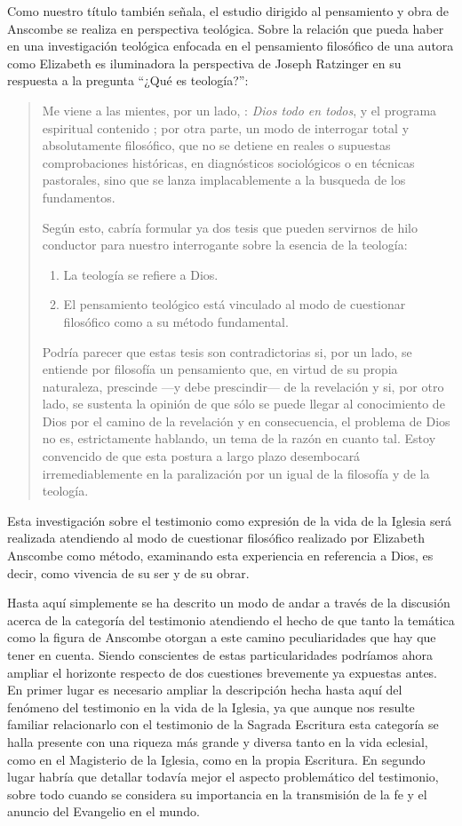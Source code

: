 Como nuestro título también señala, el estudio dirigido al pensamiento y obra de Anscombe se realiza en perspectiva teológica. Sobre la relación que pueda haber en una investigación teológica enfocada en el pensamiento filosófico de una autora como Elizabeth es iluminadora la perspectiva de Joseph Ratzinger en su respuesta a la pregunta \enquote{¿Qué es teología?}: \blockquote[{\cite[380]{ratzinger2005teoria}}]{Me viene a las mientes, por un lado, : \emph{Dios todo en todos}, y el programa espiritual contenido ; por otra parte, \textelp{} un modo de interrogar total y absolutamente filosófico, que no se detiene en reales o supuestas comprobaciones históricas, en diagnósticos sociológicos o en técnicas pastorales, sino que se lanza implacablemente a la busqueda de los fundamentos.

Según esto, cabría formular ya dos tesis que pueden servirnos de hilo conductor para nuestro interrogante sobre la esencia de la teología:
\begin{enumerate}
\item La teología se refiere a Dios.
\item El pensamiento teológico está vinculado al modo de cuestionar filosófico como a su método fundamental.
\end{enumerate}

Podría parecer que estas tesis son contradictorias si, por un lado, se entiende por filosofía un pensamiento que, en virtud de su propia naturaleza, prescinde ---y debe prescindir--- de la revelación y si, por otro lado, se sustenta la opinión de que sólo se puede llegar al conocimiento de Dios por el camino de la revelación y en consecuencia, el problema de Dios no es, estrictamente hablando, un tema de la razón en cuanto tal. Estoy convencido de que esta postura \textelp{} a largo plazo desembocará irremediablemente en la paralización por un igual de la filosofía y de la teología.} Esta investigación sobre el testimonio como expresión de la vida de la Iglesia será realizada atendiendo al modo de cuestionar filosófico realizado por Elizabeth Anscombe como método, examinando esta experiencia en referencia a Dios, es decir, como vivencia de su ser y de su obrar.

Hasta aquí simplemente se ha descrito un modo de andar a través de la discusión acerca de la categoría del testimonio atendiendo el hecho de que tanto la temática como la figura de Anscombe otorgan a este camino peculiaridades que hay que tener en cuenta. Siendo conscientes de estas particularidades podríamos ahora ampliar el horizonte respecto de dos cuestiones brevemente ya expuestas antes. En primer lugar es necesario ampliar la descripción hecha hasta aquí del fenómeno del testimonio en la vida de la Iglesia, ya que aunque nos resulte familiar relacionarlo con el testimonio de la Sagrada Escritura esta categoría se halla presente con una riqueza más grande y diversa tanto en la vida eclesial, como en el Magisterio de la Iglesia, como en la propia Escritura. En segundo lugar habría que detallar todavía mejor el aspecto problemático del testimonio, sobre todo cuando se considera su importancia en la transmisión de la fe y el anuncio del Evangelio en el mundo.
